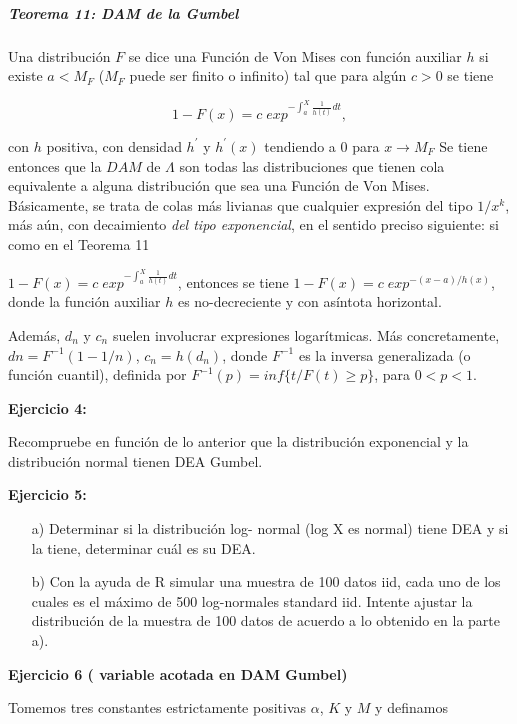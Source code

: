 \documentclass[
  oneside]{article}
\begin{document}
\hypertarget{teorema-11-dam-de-la-gumbel}{%
\subparagraph{Teorema 11: DAM de la
Gumbel}\label{teorema-11-dam-de-la-gumbel}}

Una distribución \(F\) se dice una Función de Von Mises con función
auxiliar \(h\) si existe \(a < M_F\) (\(M_F\) puede ser finito o
infinito) tal que para algún \(c>0\) se tiene

\begin{equation}
1-F(x)= c\;exp^{{- \int_a^X \frac{1}{h(t)} dt}},
\end{equation}

con \(h\) positiva, con densidad \(h^\prime\) y \(h^\prime(x)\)
tendiendo a \(0\) para \(x\rightarrow M_F\) Se tiene entonces que la
\(DAM\) de \(\Lambda\) son todas las distribuciones que tienen cola
equivalente a alguna distribución que sea una Función de Von Mises.
Básicamente, se trata de colas más livianas que cualquier expresión del
tipo \(1/x^k\), más aún, con decaimiento \textit{del tipo exponencial},
en el sentido preciso siguiente: si como en el Teorema 11

\(1-F(x)= c\;exp^{{- \int_a^X \frac{1}{h(t)} dt}}\), entonces se tiene
\(1-F(x)= c\;exp^{-(x-a)/h(x)}\), donde la función auxiliar \(h\) es
no-decreciente y con asíntota horizontal.

Además, \(d_n\) y \(c_n\) suelen involucrar expresiones logarítmicas.
Más concretamente, \(dn = F^{-1}(1-1/n)\), \(c_n = h(d_n)\), donde
\(F^{-1}\) es la inversa generalizada (o función cuantil), definida por
\(F^{-1}(p)= inf\{t / F(t)\geq p\}\), para \(0<p<1\).

\textbf{Ejercicio 4:}

Recompruebe en función de lo anterior que la distribución exponencial y
la distribución normal tienen DEA Gumbel.

\textbf{Ejercicio 5:}

\begin{itemize}
\item[a)] Determinar si la distribución log- normal (log X es normal) tiene DEA y si la tiene, determinar cuál es su DEA. 
\item[b)] Con la ayuda de R simular una muestra de 100 datos iid, cada uno de los cuales es el máximo de 500 log-normales standard iid. Intente ajustar la distribución de la muestra de 100 datos de acuerdo a lo obtenido en la parte a).
\end{itemize}

\textbf{Ejercicio 6 ( variable acotada en DAM Gumbel) }

Tomemos tres constantes estrictamente positivas \(\alpha\), \(K\) y
\(M\) y definamos
\end{document}
